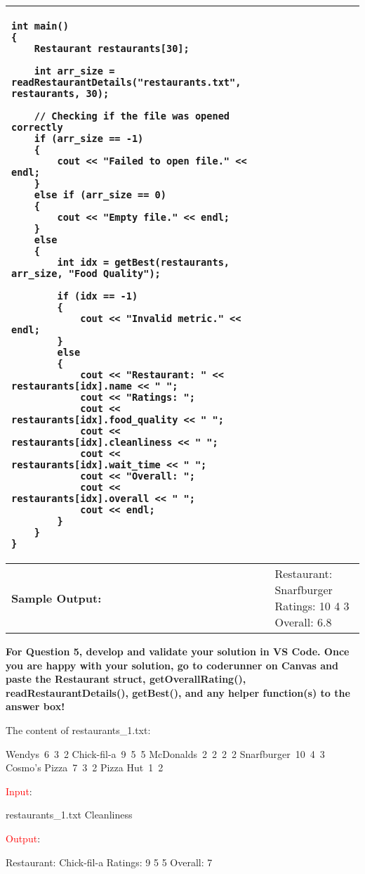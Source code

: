 \begin{longtable}{|p{1.7in}|p{4.3in}|}
\begin{example}
\begin{verbatim}
int main()
{
    Restaurant restaurants[30];

    int arr_size = readRestaurantDetails("restaurants.txt", restaurants, 30);

    // Checking if the file was opened correctly
    if (arr_size == -1)
    {
        cout << "Failed to open file." << endl;
    }
    else if (arr_size == 0)
    {
        cout << "Empty file." << endl;
    }
    else
    {
        int idx = getBest(restaurants, arr_size, "Food Quality");

        if (idx == -1)
        {
            cout << "Invalid metric." << endl;
        }
        else
        {
            cout << "Restaurant: " << restaurants[idx].name << " ";
            cout << "Ratings: ";
            cout << restaurants[idx].food_quality << " ";
            cout << restaurants[idx].cleanliness << " ";
            cout << restaurants[idx].wait_time << " ";
            cout << "Overall: ";
            cout << restaurants[idx].overall << " ";
            cout << endl;
        }
    }
}
\end{verbatim}
\end{example}
\\ \hline

\textbf{Sample Output:} &
Restaurant: Snarfburger Ratings: 10 4 3 Overall: 6.8
\\ \hline
\end{longtable}

\textbf{For Question 5, develop and validate your solution in VS Code. Once you are happy with your solution, go to coderunner on Canvas and paste the Restaurant struct, getOverallRating(), readRestaurantDetails(), getBest(), and any helper function(s) to the answer box!}

\begin{sample}

The content of restaurants\_1.txt:
\begin{tcolorbox}[colframe=blue, colback=white, boxrule=0.5mm, arc=5mm]
Wendys~6~3~2 \newline
Chick-fil-a~9~5~5 \newline
McDonalds~2~2~2~2 \newline
Snarfburger~10~4~3 \newline
Cosmo's Pizza~7~3~2 \newline
Pizza Hut~1~2
\end{tcolorbox}

\textcolor{red}{Input}:

restaurants\_1.txt \newline
Cleanliness

\textcolor{red}{Output}:

Restaurant: Chick-fil-a Ratings: 9 5 5 Overall: 7

\end{sample}